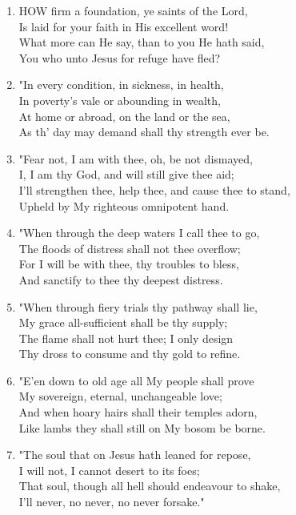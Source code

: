 \begin{enumerate}
    \item HOW firm a foundation, ye saints of the Lord, \\
        Is laid for your faith in His excellent word! \\
        What more can He say, than to you He hath said, \\
        You who unto Jesus for refuge have fled?

    \item "In every condition, in sickness, in health, \\
        In poverty's vale or abounding in wealth, \\
        At home or abroad, on the land or the sea, \\
        As th' day may demand shall thy strength ever be.

    \item "Fear not, I am with thee, oh, be not dismayed, \\
        I, I am thy God, and will still give thee aid; \\
        I'll strengthen thee, help thee, and cause thee to stand, \\
        Upheld by My righteous omnipotent hand.

    \item "When through the deep waters I call thee to go, \\
        The floods of distress shall not thee overflow; \\
        For I will be with thee, thy troubles to bless, \\
        And sanctify to thee thy deepest distress.

    \item "When through fiery trials thy pathway shall lie, \\
        My grace all-sufficient shall be thy supply; \\
        The flame shall not hurt thee; I only design \\
        Thy dross to consume and thy gold to refine.

    \item "E'en down to old age all My people shall prove \\
        My sovereign, eternal, unchangeable love; \\
        And when hoary hairs shall their temples adorn, \\
        Like lambs they shall still on My bosom be borne.

    \item "The soul that on Jesus hath leaned for repose, \\
        I will not, I cannot desert to its foes; \\
        That soul, though all hell should endeavour to shake, \\
        I'll never, no never, no never forsake."

\end{enumerate}

